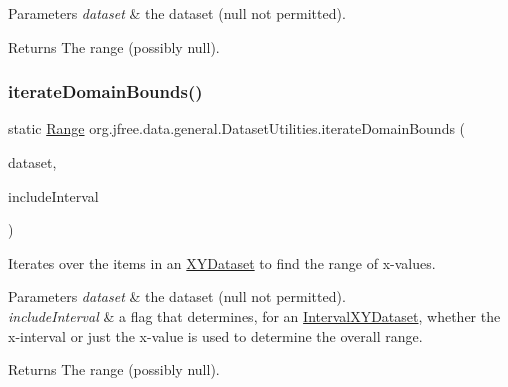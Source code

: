 \begin{DoxyParams}{Parameters}
{\em dataset} & the dataset ({\ttfamily null} not permitted).\\
\hline
\end{DoxyParams}
\begin{DoxyReturn}{Returns}
The range (possibly {\ttfamily null}). 
\end{DoxyReturn}
\mbox{\label{classorg_1_1jfree_1_1data_1_1general_1_1_dataset_utilities_a23c2f4864b1d18e6faf3ae486cc443b5}} 
\subsubsection{\texorpdfstring{iterate\+Domain\+Bounds()}{iterateDomainBounds()}\hspace{0.1cm}{\footnotesize\ttfamily [2/2]}}
{\footnotesize\ttfamily static \mbox{\hyperlink{classorg_1_1jfree_1_1data_1_1_range}{Range}} org.\+jfree.\+data.\+general.\+Dataset\+Utilities.\+iterate\+Domain\+Bounds (\begin{DoxyParamCaption}\item[{\mbox{\hyperlink{interfaceorg_1_1jfree_1_1data_1_1xy_1_1_x_y_dataset}{X\+Y\+Dataset}}}]{dataset,  }\item[{boolean}]{include\+Interval }\end{DoxyParamCaption})\hspace{0.3cm}{\ttfamily [static]}}

Iterates over the items in an \mbox{\hyperlink{}{X\+Y\+Dataset}} to find the range of x-\/values.


\begin{DoxyParams}{Parameters}
{\em dataset} & the dataset ({\ttfamily null} not permitted). \\
\hline
{\em include\+Interval} & a flag that determines, for an \mbox{\hyperlink{}{Interval\+X\+Y\+Dataset}}, whether the x-\/interval or just the x-\/value is used to determine the overall range.\\
\hline
\end{DoxyParams}
\begin{DoxyReturn}{Returns}
The range (possibly {\ttfamily null}). 
\end{DoxyReturn}
\mbox{\label{classorg_1_1jfree_1_1data_1_1general_1_1_dataset_utilities_ab1cac3435f49ea56da0111ddd72b9ef8}} 
